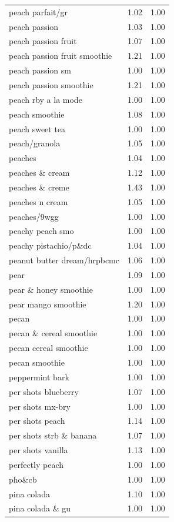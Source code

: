 \begin{table}
\begin{tabular}{lrr}
peach parfait/gr & 1.02 & 1.00 \\
peach passion & 1.03 & 1.00 \\
peach passion fruit & 1.07 & 1.00 \\
peach passion fruit smoothie & 1.21 & 1.00 \\
peach passion sm & 1.00 & 1.00 \\
peach passion smoothie & 1.21 & 1.00 \\
peach rby a la mode & 1.00 & 1.00 \\
peach smoothie & 1.08 & 1.00 \\
peach sweet tea & 1.00 & 1.00 \\
peach/granola & 1.05 & 1.00 \\
peaches & 1.04 & 1.00 \\
peaches \& cream & 1.12 & 1.00 \\
peaches \& creme & 1.43 & 1.00 \\
peaches n cream & 1.05 & 1.00 \\
peaches/9wgg & 1.00 & 1.00 \\
peachy peach smo & 1.00 & 1.00 \\
peachy pistachio/p\&dc & 1.04 & 1.00 \\
peanut butter dream/hrpbcmc & 1.06 & 1.00 \\
pear & 1.09 & 1.00 \\
pear \& honey smoothie & 1.00 & 1.00 \\
pear mango smoothie & 1.20 & 1.00 \\
pecan & 1.00 & 1.00 \\
pecan \& cereal smoothie & 1.00 & 1.00 \\
pecan cereal smoothie & 1.00 & 1.00 \\
pecan smoothie & 1.00 & 1.00 \\
peppermint bark & 1.00 & 1.00 \\
per shots blueberry & 1.07 & 1.00 \\
per shots mx-bry & 1.00 & 1.00 \\
per shots peach & 1.14 & 1.00 \\
per shots strb \& banana & 1.07 & 1.00 \\
per shots vanilla & 1.13 & 1.00 \\
perfectly peach & 1.00 & 1.00 \\
pho\&cb & 1.00 & 1.00 \\
pina colada & 1.10 & 1.00 \\
pina colada \& gu & 1.00 & 1.00 \\

\end{tabular}
\end{table}
